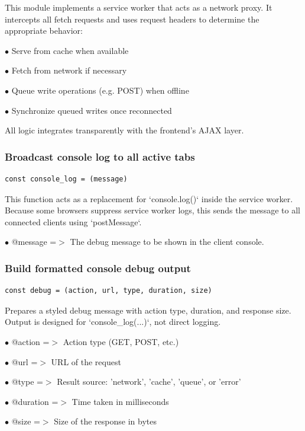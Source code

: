 \documentclass[a4paper]{article}
\begin{document}
This module implements a service worker that acts as a network proxy.
It intercepts all fetch requests and uses request headers to determine
the appropriate behavior:

\begin{compactitem}
\item[\color{myblue}$\bullet$] Serve from cache when available
\item[\color{myblue}$\bullet$] Fetch from network if necessary
\item[\color{myblue}$\bullet$] Queue write operations (e.g. POST) when offline
\item[\color{myblue}$\bullet$] Synchronize queued writes once reconnected
\end{compactitem}

All logic integrates transparently with the frontend’s AJAX layer.

\hypertarget{toc263}{}
\subsubsection{Broadcast console log to all active tabs}

\begin{lstlisting}
const console_log = (message)
\end{lstlisting}

This function acts as a replacement for `console.log()` inside the service worker.
Because some browsers suppress service worker logs, this sends the message
to all connected clients using `postMessage`.

\begin{compactitem}
\item[\color{myblue}$\bullet$] @message =$>$ The debug message to be shown in the client console.
\end{compactitem}

\hypertarget{toc264}{}
\subsubsection{Build formatted console debug output}

\begin{lstlisting}
const debug = (action, url, type, duration, size)
\end{lstlisting}

Prepares a styled debug message with action type, duration, and response size.
Output is designed for `console\_log(...)`, not direct logging.

\begin{compactitem}
\item[\color{myblue}$\bullet$] @action   =$>$ Action type (GET, POST, etc.)
\item[\color{myblue}$\bullet$] @url      =$>$ URL of the request
\item[\color{myblue}$\bullet$] @type     =$>$ Result source: 'network', 'cache', 'queue', or 'error'
\item[\color{myblue}$\bullet$] @duration =$>$ Time taken in milliseconds
\item[\color{myblue}$\bullet$] @size     =$>$ Size of the response in bytes
\end{compactitem}
\end{document}
